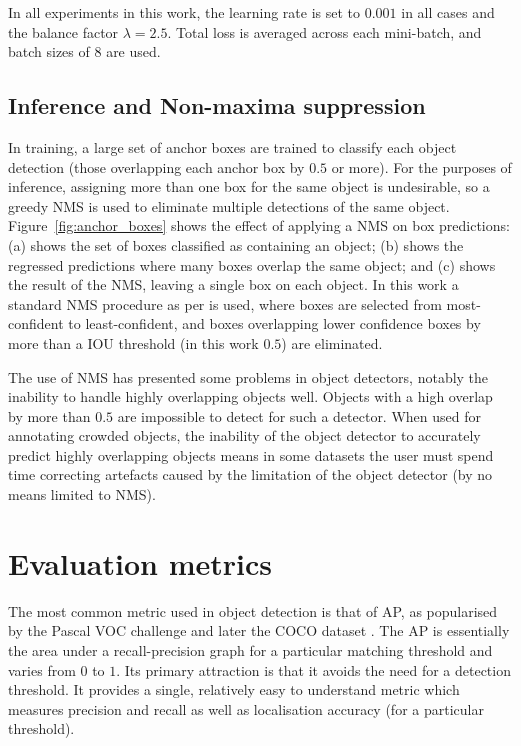 In all experiments in this work, the learning rate is set to $0.001$ in all cases and the balance factor $\lambda=2.5$. Total loss is averaged across each mini-batch, and batch sizes of $8$ are used.

\subsection{Inference and Non-maxima suppression}

In training, a large set of anchor boxes are trained to classify each object detection (those overlapping each anchor box by $0.5$ or more). For the purposes of inference, assigning more than one box for the same object is undesirable, so a greedy \gls{NMS} is used to eliminate multiple detections of the same object. Figure~\ref{fig:anchor_boxes} shows the effect of applying a \gls{NMS} on box predictions: (a) shows the set of boxes classified as containing an object; (b) shows the regressed predictions where many boxes overlap the same object; and (c) shows the result of the \gls{NMS}, leaving a single box on each object. In this work a standard \gls{NMS} procedure as per \cite{Wang2017} is used, where boxes are selected from most-confident to least-confident, and boxes overlapping lower confidence boxes by more than a \gls{IOU} threshold (in this work $0.5$) are eliminated.

The use of \gls{NMS} has presented some problems in object detectors, notably the inability to handle highly overlapping objects well. Objects with a high overlap by more than $0.5$ are impossible to detect for such a detector. When used for annotating crowded objects, the inability of the object detector to accurately predict highly overlapping objects means in some datasets the user must spend time correcting artefacts caused by the limitation of the object detector (by no means limited to \gls{NMS}).


\section{Evaluation metrics}
\label{sec:evaluation_metrics}

The most common metric used in object detection is that of \gls{AP}, as popularised by the Pascal VOC challenge \cite{Everingham2008} and later the COCO dataset \cite{Lin2014}. The \gls{AP} is essentially the area under a recall-precision graph for a particular matching threshold and varies from $0$  to $1$. Its primary attraction is that it avoids the need for a detection threshold. It provides a single, relatively easy to understand metric which measures precision and recall as well as localisation accuracy (for a particular threshold).

